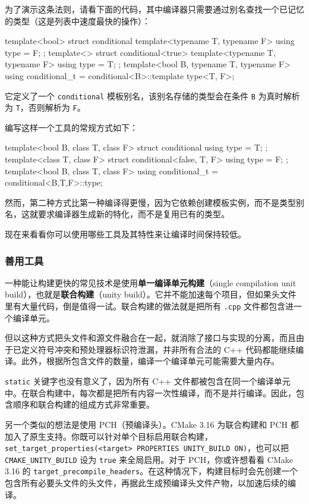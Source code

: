 为了演示这条法则，请看下面的代码，其中编译器只需要通过别名查找一个已记忆的类型（这是列表中速度最快的操作）：

\begin{codebox}[cpp]
template<bool>
struct conditional {
  template<typename T, typename F>
  using type = F;
};
template<>
struct conditional<true> {
  template<typename T, typename F>
  using type = T;
};
template<bool B, typename T, typename F>
using conditional_t = conditional<B>::template type<T, F>;
\end{codebox}

它定义了一个 \texttt{conditional} 模板别名，该别名存储的类型会在条件 \texttt{B} 为真时解析为 \texttt{T}，否则解析为 \texttt{F}。

\label{idx:646}
编写这样一个工具的常规方式如下：

\begin{codebox}[cpp]
template<bool B, class T, class F>
struct conditional {
  using type = T;
};
template<class T, class F>
struct conditional<false, T, F> {
  using type = F;
};
template<bool B, class T, class F>
using conditional_t = conditional<B,T,F>::type;
\end{codebox}

然而，第二种方式比第一种编译得更慢，因为它依赖创建模板实例，而不是类型别名，这就要求编译器生成新的特化，而不是复用已有的类型。

现在来看看你可以使用哪些工具及其特性来让编译时间保持较低。

\subsubsection{善用工具}

\label{idx:647}
\label{idx:648}
\label{idx:649}
一种能让构建更快的常见技术是使用\textbf{单一编译单元构建}（single compilation unit build），也就是\textbf{联合构建}（unity build）。它并不能加速每个项目，但如果头文件里有大量代码，倒是值得一试。联合构建的做法就是把所有 \texttt{.cpp} 文件都包含进一个编译单元。

但以这种方式把头文件和源文件融合在一起，就消除了接口与实现的分离，而且由于已定义符号冲突和预处理器标识符泄漏，并非所有合法的 C++ 代码都能继续编译。此外，根据所包含文件的数量，编译一个编译单元可能需要大量内存。

\texttt{static} 关键字也没有意义了，因为所有 C++ 文件都被包含在同一个编译单元中。在联合构建中，每次都是把所有内容一次性编译，而不是并行编译。因此，包含顺序和联合构建的组成方式非常重要。

另一个类似的想法是使用 PCH（预编译头）。CMake 3.16 为联合构建和 PCH 都加入了原生支持。你既可以针对单个目标启用联合构建，\texttt{set\_\allowbreak{}target\_\allowbreak{}properties(\allowbreak{}<target> PROPERTIES UNITY\_\allowbreak{}BUILD ON)\allowbreak{}}，也可以把 \texttt{CMAKE\_\allowbreak{}UNITY\_\allowbreak{}BUILD} 设为 \texttt{true} 来全局启用。对于 PCH，你或许想看看 CMake 3.16 的 \texttt{target\_\allowbreak{}precompile\_\allowbreak{}headers}。在这种情况下，构建目标时会先创建一个包含所有必要头文件的头文件，再据此生成预编译头文件产物，以加速后续的编译。

